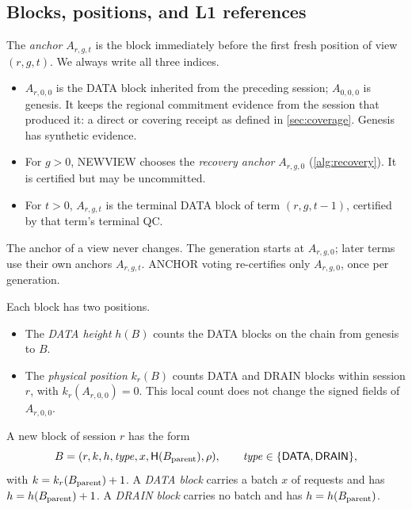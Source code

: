 \documentclass[11pt,a4paper]{article}
\newcommand{\Hash}{\mathsf H}
\newcommand{\tagg}[1]{\ensuremath{\mathsf{#1}}}
\newcommand{\defterm}[1]{\textcolor{rrBlue}{\textit{#1}}}
\begin{document}
\subsection{Blocks, positions, and L1 references}
\label{sec:blocks}
The \defterm{anchor} $A_{r,g,t}$ is the block immediately before the first fresh
position of view $(r,g,t)$. We always write all three indices.
\begin{itemize}
\item $A_{r,0,0}$ is the DATA block inherited from the preceding
session; $A_{0,0,0}$ is genesis. It keeps the regional commitment evidence from the session that
produced it: a direct or covering receipt as defined in
\cref{sec:coverage}. Genesis has synthetic evidence.
\item For $g>0$, NEWVIEW chooses the \defterm{recovery anchor} $A_{r,g,0}$
(\cref{alg:recovery}). It is certified but may be uncommitted.
\item For $t>0$, $A_{r,g,t}$ is the terminal DATA block of term
$(r,g,t-1)$, certified by that term's terminal QC.
\end{itemize}
The anchor of a view never changes. The generation starts at
$A_{r,g,0}$; later terms use their own anchors $A_{r,g,t}$. ANCHOR voting
re-certifies only $A_{r,g,0}$, once per generation.

Each block has two positions.
\begin{itemize}
\item The \defterm{DATA height} $h(B)$ counts the DATA blocks on the chain
from genesis to $B$.
\item The \defterm{physical position} $k_r(B)$ counts DATA and DRAIN blocks
within session $r$, with $k_r(A_{r,0,0})=0$. This local count does not change
the signed fields of $A_{r,0,0}$.
\end{itemize}
A new block of session $r$ has the form
\[
 B=(r,k,h,\mathit{type},x,\Hash(B_{\rm parent}),\rho),
 \qquad \mathit{type}\in\{\tagg{DATA},\tagg{DRAIN}\},
\]
with $k=k_r(B_{\rm parent})+1$. A \defterm{DATA block} carries a batch $x$ of
requests and has $h=h(B_{\rm parent})+1$. A \defterm{DRAIN block} carries no batch
and has $h=h(B_{\rm parent})$.
\end{document}
